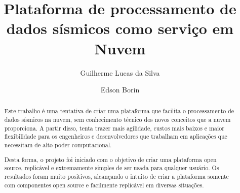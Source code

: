\documentclass[11pt,twoside]{article}
\begin{document}
% 

%



\TRMakeCover


%
\pagestyle{myheadings}

%
\title{Plataforma de processamento de dados sísmicos como serviço em Nuvem}

\author{Guilherme Lucas da Silva \and Edson Borin}

\date{}

\maketitle


\begin{abstract} 
  Este trabalho é uma tentativa de criar uma plataforma que facilita o 
  processamento de dados sísmicos na nuvem, sem conhecimento técnico dos
  novos conceitos que a nuvem proporciona. A partir disso, tenta trazer
  mais agilidade, custos mais baixos e maior flexibilidade para os 
  engenheiros e desenvolvedores que trabalham em aplicações que 
  necessitam de alto poder computacional.

  Desta forma, o projeto foi iniciado com o objetivo de criar uma plataforma
  open source, replicável e extremamente simples de ser usada para qualquer 
  usuário. Os resultados foram muito positivos, alcançando o intuito de criar
  a plataforma somente com componentes open source e facilmente replicável em
  diversas situações.
\end{abstract}
\end{document}
